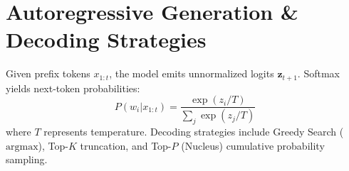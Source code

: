 \documentclass[11pt,a4paper]{article}
\begin{document}
\section{Autoregressive Generation \& Decoding Strategies}
Given prefix tokens $x_{1:t}$, the model emits unnormalized logits $\mathbf{z}_{t+1}$. Softmax yields next-token probabilities:
\begin{equation}
P(w_i | x_{1:t}) = \frac{\exp(z_i / T)}{\sum_j \exp(z_j / T)}
\end{equation}
where $T$ represents temperature. Decoding strategies include Greedy Search ($\text{argmax}$), Top-$K$ truncation, and Top-$P$ (Nucleus) cumulative probability sampling.
\end{document}
